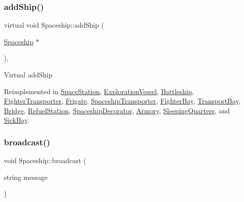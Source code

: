 \mbox{\label{classSpaceship_a90e1321cdbcb459b98b75ab39cef867d}} 
\subsubsection{\texorpdfstring{add\+Ship()}{addShip()}}
{\footnotesize\ttfamily virtual void Spaceship\+::add\+Ship (\begin{DoxyParamCaption}\item[{\hyperlink{classSpaceship}{Spaceship} $\ast$}]{ }\end{DoxyParamCaption})\hspace{0.3cm}{\ttfamily [inline]}, {\ttfamily [virtual]}}

Virtual add\+Ship 

Reimplemented in \hyperlink{classSpaceStation_ace2d37733fa5af9551aba31bc9229ad3}{Space\+Station}, \hyperlink{classExplorationVessel_ac6bc6807891edf928fae68e7ed850d14}{Exploration\+Vessel}, \hyperlink{classBattleship_a9167350d564a8f8286841408f0bacdf9}{Battleship}, \hyperlink{classFighterTransporter_ae4191358a54d0f30476beea30aa16317}{Fighter\+Transporter}, \hyperlink{classFrigate_a000802431ba3db8b45bfa6e7ae153de4}{Frigate}, \hyperlink{classSpaceshipTransporter_a493a4ba44d26a2ae4e85b79e6970fb91}{Spaceship\+Transporter}, \hyperlink{classFighterBay_a8975b88b27663c76f82168752593ceda}{Fighter\+Bay}, \hyperlink{classTransportBay_acd6b5b09e81bd28c6dcbe23d561fd99c}{Transport\+Bay}, \hyperlink{classBridge_a49676496d07502909958e747ef4c3214}{Bridge}, \hyperlink{classRefuelStation_a03510ee8365b5095ca80fac0c5a0a780}{Refuel\+Station}, \hyperlink{classSpaceshipDecorator_a5ed39419f5fab65dd4af11bf5136f7a4}{Spaceship\+Decorator}, \hyperlink{classArmory_adccb51a0901294546bfb1da350ae6836}{Armory}, \hyperlink{classSleepingQuarters_ae15ba2bf6be5cc0d4580da9ecbbe28f5}{Sleeping\+Quarters}, and \hyperlink{classSickBay_aa70415a7714cdd88553f3694b3f2e9e1}{Sick\+Bay}.

\mbox{\label{classSpaceship_a6539b155cc0dc525c506eee788fe9449}} 
\subsubsection{\texorpdfstring{broadcast()}{broadcast()}}
{\footnotesize\ttfamily void Spaceship\+::broadcast (\begin{DoxyParamCaption}\item[{string}]{message }\end{DoxyParamCaption})}

